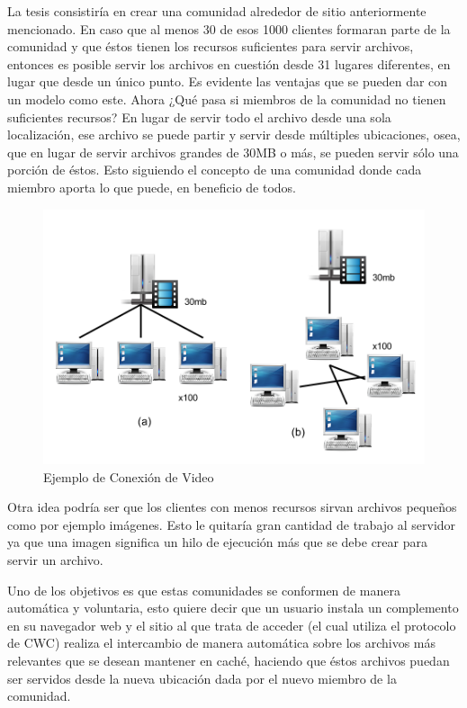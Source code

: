 La tesis consistiría en crear una comunidad alrededor de sitio anteriormente mencionado. En caso que al menos 30 de esos 1000 clientes formaran parte de la comunidad y que éstos tienen los recursos suficientes para servir archivos, entonces es posible servir los archivos en cuestión desde 31 lugares diferentes, en lugar que desde un único punto. Es evidente las ventajas que se pueden dar con un modelo como este. Ahora ¿Qué pasa si miembros de la comunidad no tienen suficientes recursos? En lugar de servir todo el archivo desde una sola localización, ese archivo se puede partir y servir desde múltiples ubicaciones, osea, que en lugar de servir archivos grandes de 30MB o más, se pueden servir sólo una porción de éstos. Esto siguiendo el concepto de una comunidad donde cada miembro aporta lo que puede, en beneficio de todos. 

\begin{figure}[h]
  \centering
    \includegraphics[scale=0.7]{gfx/conexion_video}
  \caption{Ejemplo de Conexión de Video}
  \label{conexionvideo}
\end{figure}

Otra idea podría ser que los clientes con menos recursos sirvan archivos pequeños como por ejemplo imágenes. Esto le quitaría gran cantidad de trabajo al servidor ya que una imagen significa un hilo de ejecución más que se debe crear para servir un archivo.

Uno de los objetivos es que estas comunidades se conformen de manera automática y voluntaria, esto quiere decir que un usuario instala un complemento en su navegador web y el sitio al que trata de acceder (el cual utiliza el protocolo de CWC) realiza el intercambio de manera automática sobre los archivos más relevantes que se desean mantener en caché, haciendo que éstos archivos puedan ser servidos desde la nueva ubicación dada por el nuevo miembro de la comunidad.

